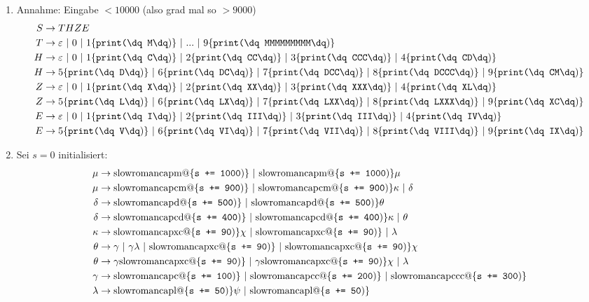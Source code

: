 \documentclass[a4paper,10pt]{scrartcl}
\makeatletter
\newcommand{\Rm}[1]{\textrm{\expandafter\@slowromancap\romannumeral #1@}}
\newcommand{\print}[1]{\{\texttt{print(\dq #1\dq})\}}
\newcommand{\add}[1]{\{\texttt{s += #1})\}}
\makeatother
\begin{document}
\section{}
\begin{enumerate}
 \item  Annahme: Eingabe $<10000$ (also grad mal so $>9000$)
        \begin{align*}
        S &\to THZE \\
        T &\to \varepsilon\ |\ 0\ |\ 1\print{M}\ |\ ...\ |\ 9\print{MMMMMMMMM} \\
        H &\to \varepsilon\ |\ 0\ |\ 1\print{C}\ |\ 2\print{CC}\ |\ 3\print{CCC}\ |\ 4\print{CD} \\
        H &\to 5\print{D}\ |\ 6\print{DC}\ |\ 7\print{DCC}\ |\ 8\print{DCCC}\ |\ 9\print{CM} \\
        Z &\to \varepsilon\ |\ 0\ |\ 1\print{X}\ |\ 2\print{XX}\ |\ 3\print{XXX}\ |\ 4\print{XL} \\
        Z &\to 5\print{L}\ |\ 6\print{LX}\ |\ 7\print{LXX}\ |\ 8\print{LXXX}\ |\ 9\print{XC} \\
        E &\to \varepsilon\ |\ 0\ |\ 1\print{I}\ |\ 2\print{III}\ |\ 3\print{III}\ |\ 4\print{IV} \\
        E &\to 5\print{V}\ |\ 6\print{VI}\ |\ 7\print{VII}\ |\ 8\print{VIII}\ |\ 9\print{IX}
        \end{align*}
 \item  Sei $s = 0$ initialisiert:
        \begin{align*}
        \mu     &\to \Rm{1000}\add{1000}\ |\ \Rm{1000}\add{1000}\mu \\
        \mu     &\to \Rm{900}\add{900}\ |\ \Rm{900}\add{900}\kappa\ |\ \delta \\
        \delta  &\to \Rm{500}\add{500}\ |\ \Rm{500}\add{500}\theta\\
        \delta  &\to \Rm{400}\add{400}\ |\ \Rm{400}\add{400}\kappa\ |\ \theta \\
        \kappa  &\to \Rm{90}\add{90}\chi\ |\ \Rm{90}\add{90}\ |\ \lambda \\
        \theta  &\to \gamma\ |\ \gamma\lambda\ |\ \Rm{90}\add{90}\ |\ \Rm{90}\add{90}\chi\\
        \theta  &\to \gamma \Rm{90}\add{90}\ |\ \gamma \Rm{90}\add{90}\chi\ |\ \lambda  \\
        \gamma  &\to \Rm{100}\add{100}\ |\ \Rm{200}\add{200}\ |\ \Rm{300}\add{300} \\
        \lambda &\to \Rm{50}\add{50}\psi\ |\ \Rm{50}\add{50}\\

\end{align*}
\end{enumerate}
\end{document}
